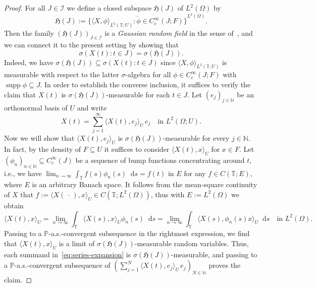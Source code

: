\documentclass[reqno]{amsart}
\numberwithin{equation}{section}
\newcommand{\bbP}{\mathbb{P}}
\newcommand{\bbT}{\mathbb{T}}
\newcommand{\N}{\mathbb{N}}
\newcommand{\scalar}[2]{     \langle #1       \rangle_{ #2 }}
\newcommand{\rd}{\mathop{}\!\mathrm{d}}
\newcommand{\clos}[1]{\overline{ #1 }}
\newcommand{\supp}{\operatorname{supp}}
\theoremstyle{remark}
\theoremstyle{definition}
\begin{document}
%
\begin{proof}
	For all $J \in \mathscr I$ we 
	define a closed subspace $\mathfrak H(J)$ of $L^2(\Omega)$ by
	\begin{equation}\label{eq:def-HJ}
		\mathfrak H(J) 
		:=
		\clos{\{\langle X, \phi \rangle_{L^2(\bbT; U)} : \phi \in C_c^\infty(J; F) \}}^{L^2(\Omega)}.
	\end{equation}
	Then the family $(\mathfrak H(J))_{J \in \mathscr I}$ is 
	a \emph{Gaussian random field} in the sense of~\cite[Chapter~2, Section~3.1]{Rozanov1982},
	and we can connect it to the present setting by showing that
	\begin{equation}
		\sigma(X(t) : t \in J)
		=
		\sigma(\mathfrak H(J)).
	\end{equation}
	Indeed, we have $\sigma(\mathfrak H(J)) \subseteq \sigma(X(t) : t \in J)$
	since $\langle X, \phi \rangle_{L^2(\bbT; U)}$ is 
	measurable with respect to the latter $\sigma$-algebra for all $\phi \in C_c^\infty(J; F)$ with $\supp \phi \subseteq J$.
	In order to establish the converse inclusion, it suffices to verify the claim that $X(t)$ is $\sigma(\mathfrak H(J))$-measurable 
	for each $t \in J$. 
	Let $(e_j)_{j\in\N}$ be an orthonormal basis of $U$ 
	and write
	\begin{equation}\label{eq:series-expansion}
		X(t) = \sum_{j = 1}^\infty \scalar{X(t), e_j}{U} \, e_j
		\quad 
		\text{in } L^2(\Omega; U).
	\end{equation}
	Now we will show that $\scalar{X(t), e_j}{U}$ is $\sigma(\mathfrak H(J))$-measurable for every $j \in \N$.
	In fact, by the density of $F \subseteq U$ it suffices to consider $\langle X(t), x \rangle_U$ for $x \in F$.
	Let $(\phi_n)_{n\in \N} \subseteq C_c^\infty(J)$ be a sequence of 
	bump functions concentrating around $t$,
	i.e., we have $\lim_{n\to\infty} \int_{\bbT} f(s) \phi_n(s) \rd s = f(t)$ in $E$
	for any $f \in C(\bbT; E)$, where $E$ is an arbitrary Banach space.
	It follows from the mean-square continuity of $X$ that
	$f := \scalar{X(\,\cdot\,), x}{U} \in C(\bbT; L^2(\Omega))$, thus with $E := L^2(\Omega)$ we obtain
	\[
	\scalar{X(t), x}{U} 
	=
	\lim_{n \to \infty} \int_\bbT \scalar{X(s), x}{U} \phi_n(s) \rd s
	=
	\lim_{n \to \infty} \int_\bbT \scalar{X(s), \phi_n(s) x}{U} \rd s
	\quad 
	\text{in } L^2(\Omega).
	\]
	Passing to a $\bbP$-a.s.-convergent subsequence in the rightmost expression,
	we find that $\scalar{X(t), x}{U}$ is a limit of $\sigma(\mathfrak H(J))$-measurable 
	random variables. Thus, each summand in~\eqref{eq:series-expansion} is 
	$\sigma(\mathfrak H(J))$-measurable, and passing to a $\bbP$-a.s.-convergent subsequence of
	$(\sum_{j = 1}^N \scalar{X(t), e_j}{U} \, e_j)_{N \in \N}$ proves the claim.
	

\end{proof}
\end{document}
